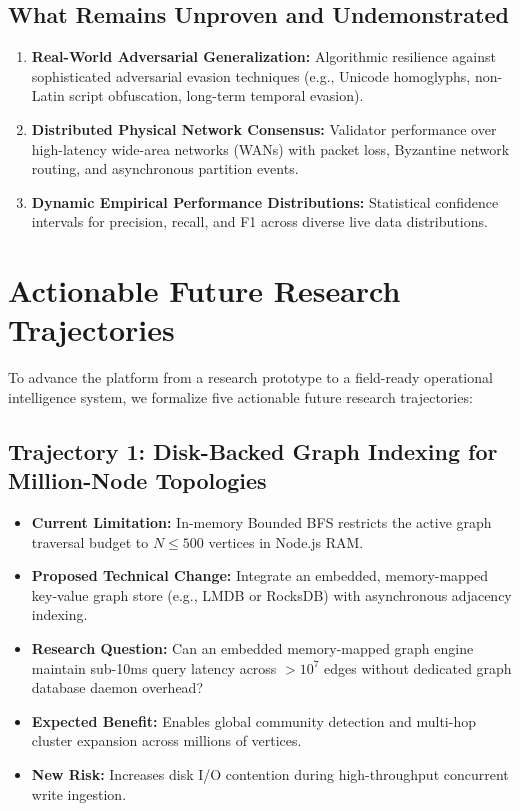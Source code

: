 \subsection{What Remains Unproven and Undemonstrated}
\begin{enumerate}
    \item \textbf{Real-World Adversarial Generalization:} Algorithmic resilience against sophisticated adversarial evasion techniques (e.g., Unicode homoglyphs, non-Latin script obfuscation, long-term temporal evasion).
    \item \textbf{Distributed Physical Network Consensus:} Validator performance over high-latency wide-area networks (WANs) with packet loss, Byzantine network routing, and asynchronous partition events.
    \item \textbf{Dynamic Empirical Performance Distributions:} Statistical confidence intervals for precision, recall, and F1 across diverse live data distributions.
\end{enumerate}

\section{Actionable Future Research Trajectories}
\label{sec:actionable_future_work}

To advance the platform from a research prototype to a field-ready operational intelligence system, we formalize five actionable future research trajectories:

\subsection{Trajectory 1: Disk-Backed Graph Indexing for Million-Node Topologies}
\begin{itemize}[noitemsep]
    \item \textbf{Current Limitation:} In-memory Bounded BFS restricts the active graph traversal budget to $N \le 500$ vertices in Node.js RAM.
    \item \textbf{Proposed Technical Change:} Integrate an embedded, memory-mapped key-value graph store (e.g., LMDB or RocksDB) with asynchronous adjacency indexing.
    \item \textbf{Research Question:} Can an embedded memory-mapped graph engine maintain sub-10ms query latency across $>10^7$ edges without dedicated graph database daemon overhead?
    \item \textbf{Expected Benefit:} Enables global community detection and multi-hop cluster expansion across millions of vertices.
    \item \textbf{New Risk:} Increases disk I/O contention during high-throughput concurrent write ingestion.
\end{itemize}

